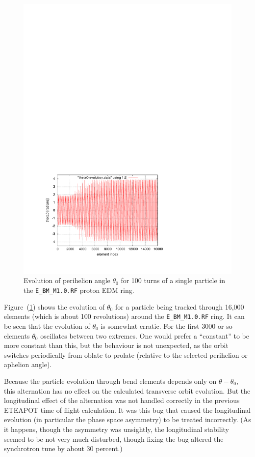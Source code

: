 \documentclass[]{article}
\begin{document}
%
\begin{figure}[h]
\centering
\includegraphics[scale=0.8]{pdf/theta0-evolution.pdf}
\caption{\label{fig:theta0-evolution}Evolution of perihelion angle $\theta_0$
for 100 turns of a single particle in the {\tt E\_BM\_M1.0.RF} proton EDM ring.}
\end{figure}
%
Figure~(\ref{fig:theta0-evolution}) shows the evolution
of $\theta_0$ for a particle being tracked through 16,000 elements
(which is about 100 revolutions) around the {\tt E\_BM\_M1.0.RF} ring. 
It can be seen that the evolution of $\theta_0$ is somewhat erratic.
For the first 3000 or so elements $\theta_0$ oscillates between two
extremes. One would prefer a ``constant'' to be more constant than this,
but the behaviour is not unexpected, as the orbit switches periodically from
oblate to prolate (relative to the selected perihelion or aphelion angle).

Because the particle evolution through bend elements depends only
on $\theta-\theta_0$, this alternation has no effect on the calculated
transverse orbit evolution. But the longitudinal effect of the alternation 
was not 
handled correctly in the previous ETEAPOT time of flight calculation. 
It was this bug that caused the longitudinal evolution (in particular the
phase space asymmetry) to be treated incorrectly. (As it happens, though
the asymmetry was unsightly, the longitudinal stability seemed to be
not very much disturbed, though fixing the bug altered the synchrotron tune by
about 30 percent.)
\end{document}
